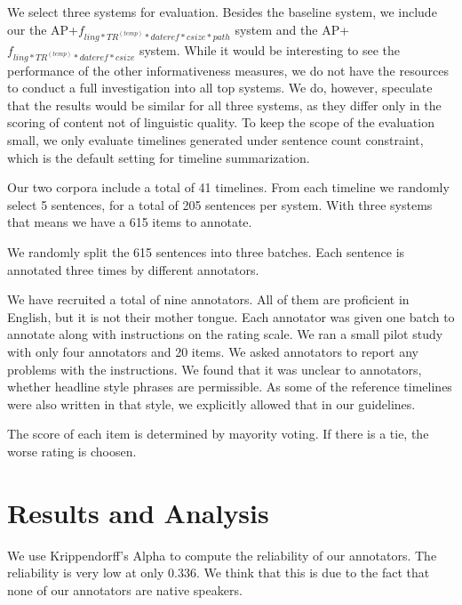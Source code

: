 \documentclass[a4paper,BCOR=10mm]{report}
\numberwithin{lemma}{chapter}
\numberwithin{definition}{chapter}
\begin{document}
We select three systems for evaluation. Besides the baseline system, we include our the AP+$f_{ ling*TR^{(temp)}*\mathit{dateref}*\mathit{csize}*\mathit{path} }$ system and the AP+$f_{ ling*TR^{(temp)}*\mathit{dateref}*\mathit{csize} }$ system. While it would be interesting to see the performance of the other informativeness measures, we do not have the resources to conduct a full investigation into all top systems.
We do, however, speculate that the results would be similar for all three systems, as they differ only in the scoring of content not of linguistic quality.
To keep the scope of the evaluation small, we only evaluate timelines generated under sentence count constraint, which is the default setting for timeline summarization.

Our two corpora include a total of 41 timelines.
From each timeline we randomly select 5 sentences, for a total of 205 sentences per system.
With three systems that means we have a 615 items to annotate.

We randomly split the 615 sentences into three batches. Each sentence is annotated three times by different annotators.

We have recruited a total of nine annotators. All of them are proficient in English, but it is not their mother tongue.
Each annotator was given one batch to annotate along with instructions on the rating scale. We ran a small pilot study with only four annotators and 20 items. We asked annotators to report any problems with the instructions. We found that it was unclear to annotators, whether headline style phrases are permissible.
As some of the reference timelines were also written in that style, we explicitly allowed that in our guidelines.

The score of each item is determined by mayority voting. If there is a tie, the worse rating is choosen.

\section{Results and Analysis}

We use Krippendorff's Alpha \citet{krippendorff} to compute the reliability of our annotators.
The reliability is very low at only $0.336$. We think that this is due to the fact that none of our annotators are native speakers.
\end{document}
